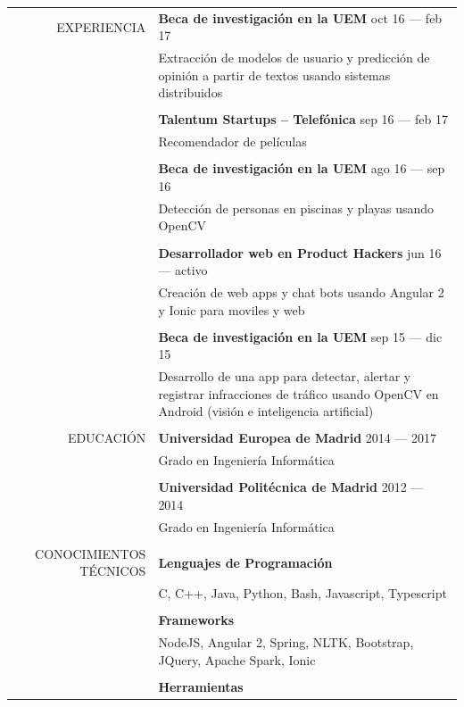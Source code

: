 \documentclass[a4paper, 11pt]{article}
\begin{document}
    \begin{longtable}{rp{11cm}}
        EXPERIENCIA
        & {\bf Beca de investigación en la UEM} \hfill oct 16 --- feb 17\\
        & Extracción de modelos de usuario y predicción de opinión a partir de textos usando sistemas distribuidos\\\\
        & {\bf Talentum Startups -- Telefónica} \hfill sep 16 --- feb 17\\
        & Recomendador de películas\\\\
        & {\bf Beca de investigación en la UEM} \hfill ago 16 --- sep 16\\
        & Detección de personas en piscinas y playas usando OpenCV\\\\
        & {\bf Desarrollador web en Product Hackers} \hfill jun 16 --- activo\\
        & Creación de web apps y chat bots usando Angular 2 y Ionic para moviles y web\\\\
        & {\bf Beca de investigación en la UEM} \hfill sep 15 --- dic 15\\
        & Desarrollo de una app para detectar, alertar y registrar infracciones de tráfico usando OpenCV en Android (visión e inteligencia artificial)\\
        \\
        EDUCACIÓN
        & {\bf Universidad Europea de Madrid} \hfill 2014 --- 2017\\
        & Grado en Ingeniería Informática\\\\
        & {\bf Universidad Politécnica de Madrid} \hfill 2012 --- 2014\\
        & Grado en Ingeniería Informática\\\\
        CONOCIMIENTOS TÉCNICOS
        & {\bf Lenguajes de Programación}\\
        & C, C++, Java, Python, Bash, Javascript, Typescript\\\\
        & {\bf Frameworks}\\
        & NodeJS, Angular 2, Spring, NLTK, Bootstrap, JQuery, Apache Spark, Ionic\\\\
        & {\bf Herramientas}\\

\end{longtable}
\end{document}
